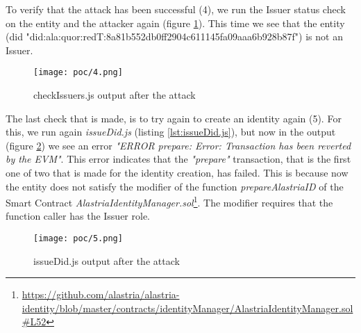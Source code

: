         To verify that the attack has been successful (4), we run the Issuer status check on the entity and the attacker again (figure \ref{fig:poc-4}). This time we see that the entity (\acrshort{did} "did:ala:quor:redT:8a81b552db0ff2904c611145fa09aaa6b928b87f") is not an Issuer.\\
        \begin{figure}[h]
            \centering
            \texttt{[image: poc/4.png]}
            \caption{checkIssuers.js output after the attack}
            \label{fig:poc-4}
        \end{figure}
        
        The last check that is made, is to try again to create an identity again (5). For this, we run again \textit{issueDid.js} (listing \ref{lst:issueDid.js}), but now in the output (figure \ref{fig:poc-5}) we see an error \textit{"ERROR prepare: Error: Transaction has been reverted by the EVM"}. This error indicates that the \textit{"prepare"} transaction, that is the first one of two that is made for the identity creation, has failed. This is because now the entity does not satisfy the modifier of the function \textit{prepareAlastriaID} of the Smart Contract \textit{AlastriaIdentityManager.sol}\footnote{\url{https://github.com/alastria/alastria-identity/blob/master/contracts/identityManager/AlastriaIdentityManager.sol\#L52}}. The modifier requires that the function caller has the Issuer role.
        \begin{figure}[h]
            \centering
            \texttt{[image: poc/5.png]}
            \caption{issueDid.js output after the attack}
            \label{fig:poc-5}
        \end{figure}
